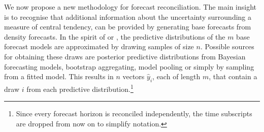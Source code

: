 \documentclass[a4paper,fleqn,11pt]{article}
\begin{document}
We now propose a new methodology for forecast reconciliation. The main insight is to recognise that additional information about the uncertainty surrounding a measure of central tendency, can be provided by generating base forecasts from density forecasts. In the spirit of \cite{Kapetanios2015} or \cite{Cesur2016}, the predictive distributions of the $m$ base forecast models are approximated by drawing samples of size $n$. Possible sources for obtaining these draws are posterior predictive distributions from Bayesian forecasting models, bootstrap aggregating, model pooling or simply by sampling from a fitted model. This results in $n$ vectors $\hat{y}_{i}$, each of length $m$, that contain a draw $i$ from each predictive distribution.\footnote{Since every forecast horizon is reconciled independently, the time subscripts are dropped from now on to simplify notation.}
\end{document}
